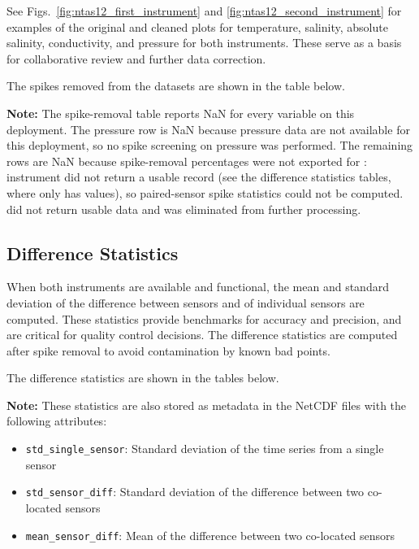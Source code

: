 See Figs.~\ref{fig:ntas12_first_instrument} and \ref{fig:ntas12_second_instrument} for examples of the original and cleaned plots for temperature, salinity, absolute salinity, conductivity, and pressure for both instruments.
These serve as a basis for collaborative review and further data correction.

The spikes removed from the datasets are shown in the table below.



\textbf{Note:} The spike-removal table reports NaN for every variable on this deployment. 
The pressure row is NaN because pressure data are not available for this deployment, so no spike screening on pressure was performed. The remaining rows are NaN because spike-removal percentages were not exported for \projectname{} \casenumber{}: instrument \SecondInstrumentType{} \SecondInstrument{} did not return a usable record (see the difference statistics tables, where only \FirstInstrumentType{} \FirstInstrument{} has values), so paired-sensor spike statistics could not be computed. \SecondInstrumentType{} \SecondInstrument{} did not return usable data and was eliminated from further processing.

\subsection{Difference Statistics}
When both instruments are available and functional, 
the mean and standard deviation of the difference between sensors and of individual sensors are computed. 
These statistics provide benchmarks for accuracy and precision, and are critical for quality control decisions.
The difference statistics are computed after spike removal to avoid contamination by known bad points.

The difference statistics are shown in the tables below.



\textbf{Note:} These statistics are also stored as metadata in the NetCDF files with the following attributes:
\begin{itemize}
\item \texttt{std\_single\_sensor}: Standard deviation of the time series from a single sensor
\item \texttt{std\_sensor\_diff}: Standard deviation of the difference between two co-located sensors
\item \texttt{mean\_sensor\_diff}: Mean of the difference between two co-located sensors
\end{itemize}

